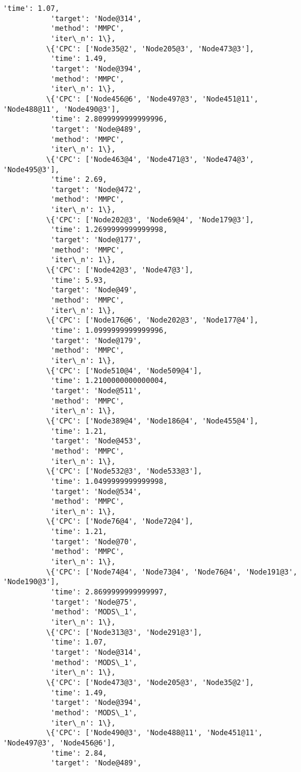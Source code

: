 \documentclass[11pt]{article}
\begin{document}
\begin{Verbatim}[commandchars=\\\{\}]
           'time': 1.07,
           'target': 'Node@314',
           'method': 'MMPC',
           'iter\_n': 1\},
          \{'CPC': ['Node35@2', 'Node205@3', 'Node473@3'],
           'time': 1.49,
           'target': 'Node@394',
           'method': 'MMPC',
           'iter\_n': 1\},
          \{'CPC': ['Node456@6', 'Node497@3', 'Node451@11', 'Node488@11', 'Node490@3'],
           'time': 2.8099999999999996,
           'target': 'Node@489',
           'method': 'MMPC',
           'iter\_n': 1\},
          \{'CPC': ['Node463@4', 'Node471@3', 'Node474@3', 'Node495@3'],
           'time': 2.69,
           'target': 'Node@472',
           'method': 'MMPC',
           'iter\_n': 1\},
          \{'CPC': ['Node202@3', 'Node69@4', 'Node179@3'],
           'time': 1.2699999999999998,
           'target': 'Node@177',
           'method': 'MMPC',
           'iter\_n': 1\},
          \{'CPC': ['Node42@3', 'Node47@3'],
           'time': 5.93,
           'target': 'Node@49',
           'method': 'MMPC',
           'iter\_n': 1\},
          \{'CPC': ['Node176@6', 'Node202@3', 'Node177@4'],
           'time': 1.0999999999999996,
           'target': 'Node@179',
           'method': 'MMPC',
           'iter\_n': 1\},
          \{'CPC': ['Node510@4', 'Node509@4'],
           'time': 1.2100000000000004,
           'target': 'Node@511',
           'method': 'MMPC',
           'iter\_n': 1\},
          \{'CPC': ['Node389@4', 'Node186@4', 'Node455@4'],
           'time': 1.21,
           'target': 'Node@453',
           'method': 'MMPC',
           'iter\_n': 1\},
          \{'CPC': ['Node532@3', 'Node533@3'],
           'time': 1.0499999999999998,
           'target': 'Node@534',
           'method': 'MMPC',
           'iter\_n': 1\},
          \{'CPC': ['Node76@4', 'Node72@4'],
           'time': 1.21,
           'target': 'Node@70',
           'method': 'MMPC',
           'iter\_n': 1\},
          \{'CPC': ['Node74@4', 'Node73@4', 'Node76@4', 'Node191@3', 'Node190@3'],
           'time': 2.8699999999999997,
           'target': 'Node@75',
           'method': 'MODS\_1',
           'iter\_n': 1\},
          \{'CPC': ['Node313@3', 'Node291@3'],
           'time': 1.07,
           'target': 'Node@314',
           'method': 'MODS\_1',
           'iter\_n': 1\},
          \{'CPC': ['Node473@3', 'Node205@3', 'Node35@2'],
           'time': 1.49,
           'target': 'Node@394',
           'method': 'MODS\_1',
           'iter\_n': 1\},
          \{'CPC': ['Node490@3', 'Node488@11', 'Node451@11', 'Node497@3', 'Node456@6'],
           'time': 2.84,
           'target': 'Node@489',

\end{Verbatim}
\end{document}
